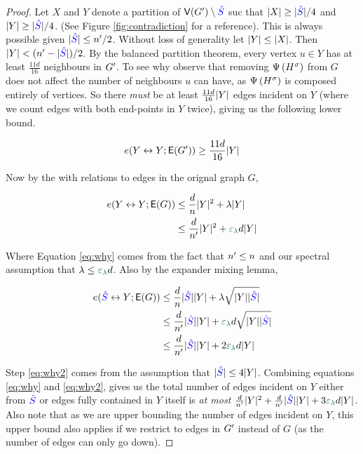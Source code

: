 \documentclass[11pt]{article}
\begin{document}
\begin{proof}
Let $X$ and $Y$ denote a partition of $\mathsf{V}(G') \setminus \textcolor{blue}{\hat{S}}$ suc that $|X| \geq |\textcolor{blue}{\hat{S}}|/4$ and $|Y| \geq |\textcolor{blue}{\hat{S}}|/4$.
(See Figure \ref{fig:contradiction} for a reference).
This is always possible given $|\textcolor{blue}{\hat{S}}| \leq n'/2$.
Without loss of generality let $|Y| \leq |X|$.
Then $|Y| < (n'-|\textcolor{blue}{\hat{S}}|)/2$.
By the balanced partition theorem, every vertex $u \in Y$ has at least $\frac{11d}{16}$  neighbours in $G'$.
To see why observe that removing $\Psi\left({H}^{\sigma}\right)$ from $G$ does not affect the number of  neighbours $u$ can have, as $\Psi\left({H}^{\sigma}\right)$ is composed entirely of  vertices.
So there \emph{must} be at least $\frac{11d}{16}|Y|$ edges incident on $Y$ (where we count edges with both end-points in $Y$ twice), giving us the following lower bound.

\begin{equation}\label{eq:edge-lower-bound}
  e(Y \leftrightarrow Y; \mathsf{E}(G')) \geq \frac{11d}{16}|Y|
\end{equation}

Now by the  with relations to edges in the orignal graph $G$,

\begin{align}
  \CutEdges{Y}{Y}{\Edges{G}}  &\leq \frac{d}{n}\Size{Y}^2 + \lambda\Size{Y} \\
  &\leq \frac{d}{\SizeRemGraph}\Size{Y}^2 + \epsilonL d \Size{Y} \label{eq:why}
\end{align}

Where Equation \eqref{eq:why} comes from the fact that $n' \leq n$ and our spectral assumption that $\lambda \leq \epsilonL d$.
Also by the expander mixing lemma,

\begin{align}
  \CutEdges{\BadSet}{Y}{\Edges{G}}  &\leq \frac{d}{n}\Size{\BadSet}\Size{Y} + \lambda\sqrt{\Size{Y}\Size{\BadSet}} \\
                                    &\leq \frac{d}{\SizeRemGraph}\Size{\BadSet}\Size{Y} + \epsilonL d\sqrt{\Size{Y}\Size{\BadSet}} \\
  &\leq \frac{d}{\SizeRemGraph}\Size{\BadSet}\Size{Y} + 2\epsilonL d\Size{Y} \label{eq:why2}
\end{align}

Step \eqref{eq:why2} comes from the assumption that $|\textcolor{blue}{\hat{S}}| \leq 4|Y|$. Combining equations \eqref{eq:why} and \eqref{eq:why2}, gives us the total number of edges incident on $Y$ either from $\textcolor{blue}{\hat{S}}$ or edges fully contained in $Y$ itself is \emph{at most} $\frac{d}{\SizeRemGraph}\Size{Y}^2 +   \frac{d}{\SizeRemGraph}\Size{\BadSet}\Size{Y} + 3\epsilonL d\Size{Y}$.
Also note that as we are upper bounding the number of edges incident on $Y$, this upper bound also applies if we restrict to edges in $G'$ instead of $G$ (as the number of edges can only go down).


\end{proof}
\end{document}
